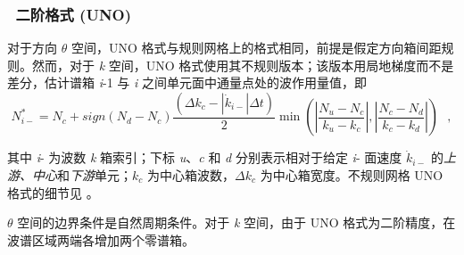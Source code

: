 \vssub
\subsubsection{~二阶格式 (UNO)}

\noindent
对于方向 $\theta$ 空间，UNO 格式与规则网格上的格式相同，前提是假定方向箱间距规则。然而，对于 \emph{k} 空间，UNO 格式使用其不规则版本；该版本用局地梯度而不是差分，估计谱箱 \emph{i}-1 与 \emph{i} 之间单元面中通量点处的波作用量值，即
\begin{equation}
  N_{i-}^{*}=N_{c}+sign\left(N_{d}-N_{c}\right)\frac{\left(\Delta
      k_{c}-|\dot{k}_{i-}|\Delta
      t\right)}{2}\min\left(|\frac{N_{u}-N_{c}}{k_{u}-k_{c}}|,|\frac{N_{c}-N_{d}}{k_{c}-k_{d}}|\right)
  \:\:\:,
\label{eq:UNO2irregular}
\end{equation}

\noindent
其中 \emph{i}- 为波数 \emph{k} 箱索引；下标 \emph{u}、\emph{c} 和 \emph{d} 分别表示相对于给定 \emph{i}- 面速度 $\dot{k}_{i-}$ 的\emph{上游、中心}和\emph{下游}单元；$k_{c}$ 为中心箱波数，$\Delta k_{c}$ 为中心箱宽度。不规则网格 UNO 格式的细节见 \cite{art:Li08}。

$\theta$ 空间的边界条件是自然周期条件。对于 \emph{k} 空间，由于 UNO 格式为二阶精度，在波谱区域两端各增加两个零谱箱。


